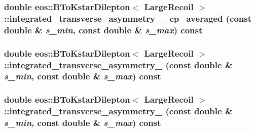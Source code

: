 \label{classeos_1_1BToKstarDilepton_3_01LargeRecoil_01_4_add9bb0e4ac8349af2d9cfdeb571cd90f}
\hypertarget{classeos_1_1BToKstarDilepton_3_01LargeRecoil_01_4_a7e8b23d9ac0248a61c0a762e50549da2}{
\subsubsection[{integrated\_\-transverse\_\-asymmetry\_\-2\_\-cp\_\-averaged}]{\setlength{\rightskip}{0pt plus 5cm}double eos::BToKstarDilepton$<$ {\bf LargeRecoil} $>$::integrated\_\-transverse\_\-asymmetry\_\_\-cp\_\-averaged (const double \& {\em s\_\-min}, \/  const double \& {\em s\_\-max}) const}}
\label{classeos_1_1BToKstarDilepton_3_01LargeRecoil_01_4_a7e8b23d9ac0248a61c0a762e50549da2}
\hypertarget{classeos_1_1BToKstarDilepton_3_01LargeRecoil_01_4_a072c0868729dccd3c25d3ebfce97bb42}{
\subsubsection[{integrated\_\-transverse\_\-asymmetry\_\-3}]{\setlength{\rightskip}{0pt plus 5cm}double eos::BToKstarDilepton$<$ {\bf LargeRecoil} $>$::integrated\_\-transverse\_\-asymmetry\_ (const double \& {\em s\_\-min}, \/  const double \& {\em s\_\-max}) const}}
\label{classeos_1_1BToKstarDilepton_3_01LargeRecoil_01_4_a072c0868729dccd3c25d3ebfce97bb42}
\hypertarget{classeos_1_1BToKstarDilepton_3_01LargeRecoil_01_4_a745412c6ccdb663f905f06be923082f2}{
\subsubsection[{integrated\_\-transverse\_\-asymmetry\_\-4}]{\setlength{\rightskip}{0pt plus 5cm}double eos::BToKstarDilepton$<$ {\bf LargeRecoil} $>$::integrated\_\-transverse\_\-asymmetry\_ (const double \& {\em s\_\-min}, \/  const double \& {\em s\_\-max}) const}}
